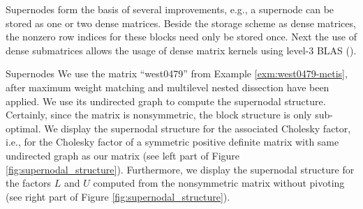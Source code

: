 Supernodes form the basis of several improvements, e.g.,
a supernode can be stored as one or two dense matrices. 
Beside the storage scheme as dense matrices, the nonzero row indices
for these blocks need only be stored once.
Next the use of dense submatrices allows the usage of dense matrix kernels
using level-3 BLAS
(\cite{AndBBDDDGHMOS99}).
\begin{example}{Supernodes}\label{exm:supernodes}
We use the matrix ``west0479'' from Example \ref{exm:west0479-metis},
after maximum weight matching and multilevel nested dissection have
been applied. 
We use its undirected graph to compute the supernodal
structure. Certainly, since the matrix is nonsymmetric, the block structure
is only sub-optimal. We display the supernodal structure for the associated
Cholesky factor, i.e., for the Cholesky factor of a symmetric positive definite
matrix with same undirected graph as our matrix (see
left part of Figure \ref{fig:supernodal_structure}). Furthermore, we display
the supernodal structure for the factors $L$ and $U$ computed from the
nonsymmetric matrix without pivoting (see right part of Figure \ref{fig:supernodal_structure}).
\end{example}
